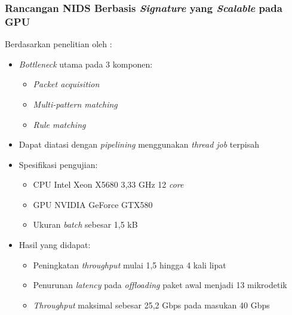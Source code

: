 \documentclass{beamer}
\begin{document}

  \begin{frame}
  \frametitle{Rancangan NIDS Berbasis \emph{Signature} yang \emph{Scalable} pada GPU}
    Berdasarkan penelitian oleh \cite{kargus2012}:
    \begin{itemize}
      \item \emph{Bottleneck} utama pada 3 komponen:
      \begin{itemize}
        \item \emph{Packet acquisition}
        \item \emph{Multi-pattern matching}
        \item \emph{Rule matching}
      \end{itemize}
      \item Dapat diatasi dengan \emph{pipelining} menggunakan \emph{thread job} terpisah
      \item Spesifikasi pengujian:
      \begin{itemize}
        \item CPU Intel Xeon X5680 3,33 GHz 12 \emph{core}
        \item GPU NVIDIA GeForce GTX580
        \item Ukuran \emph{batch} sebesar 1,5 kB
      \end{itemize}
      \item Hasil yang didapat:
      \begin{itemize}
          \item Peningkatan \emph{throughput} mulai 1,5 hingga 4 kali lipat
          \item Penurunan \emph{latency} pada \emph{offloading} paket awal menjadi 13 mikrodetik
          \item \emph{Throughput} maksimal sebesar 25,2 Gbps pada masukan 40 Gbps
      \end{itemize}
    \end{itemize}
  \end{frame}

\end{document}
